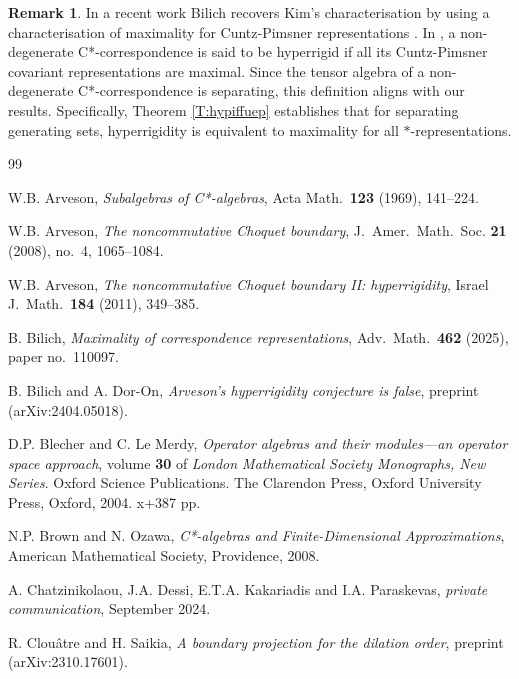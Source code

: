 \documentclass[11pt, draft]{amsart}
\numberwithin{equation}{section}
\theoremstyle{plain}
\theoremstyle{definition}
\newtheorem{remark}[theorem]{Remark}
\theoremstyle{remark}
\begin{document}
\begin{remark}\label{R:bb}
In a recent work Bilich \cite{Bil24} recovers Kim's characterisation \cite[Corollary 4.9]{Bil24} by using a characterisation of maximality for Cuntz-Pimsner representations \cite[Theorem 4.4]{Bil24}. In \cite[Definition 2.6]{Bil24}, a non-degenerate C*-correspondence is said to be hyperrigid if all its Cuntz-Pimsner covariant representations are maximal. Since the tensor algebra of a non-degenerate C*-correspondence is separating, this definition aligns with our results. Specifically, Theorem \ref{T:hypiffuep} establishes that for separating generating sets, hyperrigidity is equivalent to maximality for all $*$-representations.
\end{remark}
\begin{thebibliography}{99}

 W.B. Arveson, 
\textit{Subalgebras of C*-algebras},
Acta Math.\ \textbf{123} (1969), 141--224.

 W.B. Arveson,
\textit{The noncommutative Choquet boundary},
J.\ Amer.\ Math.\ Soc. \textbf{21} (2008), no.\ 4, 1065--1084.

 W.B. Arveson,
\textit{The noncommutative Choquet boundary II: hyperrigidity},
Israel J.\ Math.\ \textbf{184} (2011), 349--385.

 B. Bilich,
\textit{Maximality of correspondence representations},
Adv.\ Math.\ \textbf{462} (2025), paper no.\ 110097.

 B. Bilich and A. Dor-On,
\textit{Arveson's hyperrigidity conjecture is false},
preprint (arXiv:2404.05018).

 D.P. Blecher and C. Le Merdy,
\textit{Operator algebras and their modules---an operator space approach}, 
volume \textbf{30} of \textit{London Mathematical Society Monographs, New Series}. 
Oxford Science Publications.
The Clarendon Press, Oxford University Press, Oxford, 2004. x+387 pp.

 N.P. Brown and N. Ozawa, 
\textit{C*-algebras and Finite-Dimensional Approximations}, American
Mathematical Society, Providence, 2008.

 A. Chatzinikolaou, J.A. Dessi, E.T.A. Kakariadis and I.A. Paraskevas,
\textit{private communication},
September 2024.

 R. Clou{\^a}tre and H. Saikia,
\textit{A boundary projection for the dilation order},
preprint (arXiv:2310.17601).


\end{thebibliography}
\end{document}
